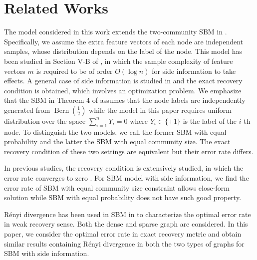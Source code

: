\documentclass[conference]{IEEEtran}
\DeclareMathOperator{\Bern}{Bern}
\begin{document}
\section{Related Works}\label{s:rw}
The model considered in this work extends the two-community SBM in \cite{abbe2015community}.
Specifically, we assume the extra feature vectors of each node are independent samples, whose distribution depends on the label of the node.
This model has been studied in Section V-B of \cite{saad2018community}, in which the sample complexity of feature vectors
$m$ is required to be of order $O(\log n)$ for side information to take effects.
A general case of side information is studied
in \cite{abbe17sideinfo} and the exact recovery condition is obtained, which involves an optimization problem.
We emphasize that the SBM in Theorem 4 of \cite{abbe17sideinfo}
assumes that the node labels are independently generated  from $\Bern(\frac{1}{2})$ while the model
in this paper requires uniform distribution over the space $\sum_{i=1}^n Y_i = 0$ where $Y_i \in \{\pm 1 \}$ is the label of the $i$-th node.
To distinguish the two models, we call the former SBM with equal probability and the latter the SBM with equal community size. The exact recovery condition of these two settings are equivalent but their error rate differs.

In previous studies, the recovery condition is extensively studied, in which the error rate converges
to zero \cite{abbe2015exact}. 
For SBM model with side information, we find the error rate of SBM with equal community size constraint allows close-form solution while SBM with
equal probability does not have such good property.

Rényi divergence has been used in SBM in \cite{zhang2016} to characterize the optimal error rate in weak
recovery sense. Both the dense and sparse graph are considered. In this paper, we consider the optimal error rate in exact recovery metric and obtain similar results containing
Rényi divergence
in both the two types of graphs for SBM with side information.
\end{document}
